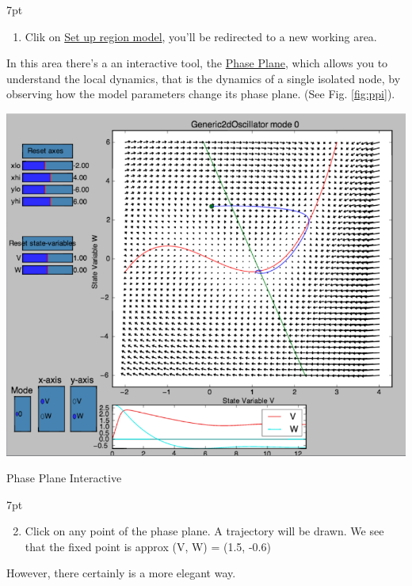 \documentclass{tufte-handout}
\newenvironment{simulation}{%
  \def\FrameCommand{%
    \hspace{1pt}%
    {\color{ForestGreen}\vrule width 2pt}%
    {\color{simulationshade}\vrule width 4pt}%
    \colorbox{simulationshade}%
  }%
  \MakeFramed{\advance\hsize-\width\FrameRestore}%
  \noindent\hspace{-4.55pt}%
  \begin{adjustwidth}{}{7pt}%
  \vspace{2pt}\vspace{2pt}%
}
{%
  \vspace{2pt}\end{adjustwidth}\endMakeFramed%
}
\begin{document}
\begin{simulation}
\begin{enumerate}
\item  Clik on \underline{Set up region model}, you'll be redirected to a new working area. 
\end{enumerate}
\end{simulation}


In this area there's a an interactive tool, the \underline{Phase Plane}, which
allows you to understand the local dynamics, that is the dynamics of a single
isolated node, by observing how the model parameters change its phase plane.
(See Fig. \ref{fig:ppi}).

\begin{marginfigure}%
  \includegraphics[width=\linewidth]{Handout_UI_BuildingYourOwnBrainNetworkModel_PhasePlane}%
  \caption{Phase Plane Interactive}%
  \label{fig:ppi}%
\end{marginfigure}%

\begin{simulation}
\begin{enumerate}[resume]
  \setcounter{enumi}{1}
\item  Click on any point of the phase plane. A trajectory will be drawn.
We see that the fixed point is approx (V, W) = (1.5, -0.6)
\end{enumerate}
\end{simulation}


However, there certainly is a more elegant way. 
\end{document}
